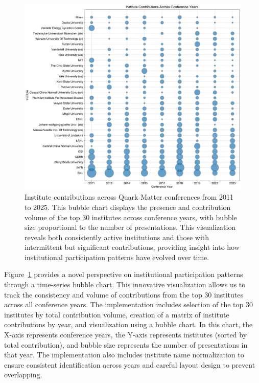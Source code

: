 \documentclass[a4paper,11pt]{article}
\begin{document}
\begin{figure}[H]
\centering
\includegraphics[width=\textwidth]{figures/institute_bubble_chart.pdf}
\caption{Institute contributions across Quark Matter conferences from 2011 to 2025. This bubble chart displays the presence and contribution volume of the top 30 institutes across conference years, with bubble size proportional to the number of presentations. This visualization reveals both consistently active institutions and those with intermittent but significant contributions, providing insight into how institutional participation patterns have evolved over time.}
\label{fig:institute_bubble}
\end{figure}

Figure~\ref{fig:institute_bubble} provides a novel perspective on institutional participation patterns through a time-series bubble chart. This innovative visualization allows us to track the consistency and volume of contributions from the top 30 institutes across all conference years. The implementation includes selection of the top 30 institutes by total contribution volume, creation of a matrix of institute contributions by year, and visualization using a bubble chart. In this chart, the X-axis represents conference years, the Y-axis represents institutes (sorted by total contribution), and bubble size represents the number of presentations in that year. The implementation also includes institute name normalization to ensure consistent identification across years and careful layout design to prevent overlapping.
\end{document}
